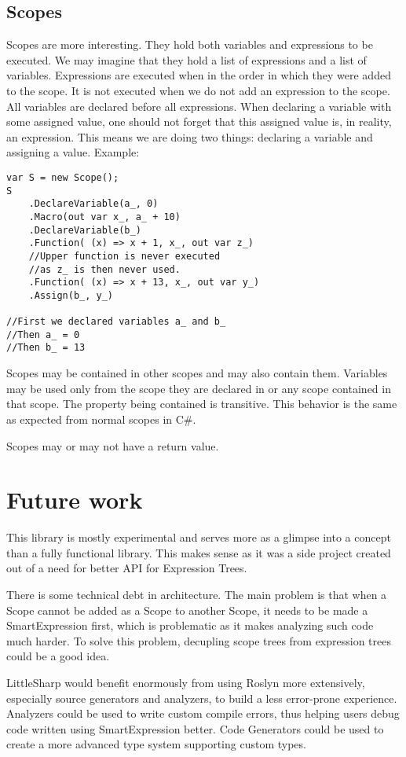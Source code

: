 \subsection{Scopes}
Scopes are more interesting. They hold both variables and expressions to be executed. We may imagine that they hold a list of expressions and a list of variables. Expressions are executed when in the order in which they were added to the scope. It is not executed when we do not add an expression to the scope. All variables are declared before all expressions. When declaring a variable with some assigned value, one should not forget that this assigned value is, in reality, an expression. This means we are doing two things: declaring a variable and assigning a value. Example: 
\begin{lstlisting}
var S = new Scope();
S
    .DeclareVariable(a_, 0)
    .Macro(out var x_, a_ + 10)
    .DeclareVariable(b_)
    .Function( (x) => x + 1, x_, out var z_)
    //Upper function is never executed
    //as z_ is then never used.
    .Function( (x) => x + 13, x_, out var y_)
    .Assign(b_, y_)

//First we declared variables a_ and b_
//Then a_ = 0
//Then b_ = 13
\end{lstlisting}

Scopes may be contained in other scopes and may also contain them. Variables may be used only from the scope they are declared in or any scope contained in that scope. The property being contained is transitive. This behavior is the same as expected from normal scopes in C\#.

Scopes may or may not have a return value. 


\section{Future work}
This library is mostly experimental and serves more as a glimpse into a concept than a fully functional library. This makes sense as it was a side project created out of a need for better API for Expression Trees. 

There is some technical debt in architecture. The main problem is that when a Scope cannot be added as a Scope to another Scope, it needs to be made a SmartExpression first, which is problematic as it makes analyzing such code much harder. To solve this problem, decupling scope trees from expression trees could be a good idea.

LittleSharp would benefit enormously from using Roslyn more extensively, especially source generators and analyzers, to build a less error-prone experience. Analyzers could be used to write custom compile errors, thus helping users debug code written using SmartExpression better. Code Generators could be used to create a more advanced type system supporting custom types.

